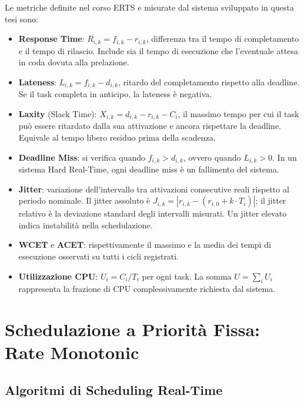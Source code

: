 Le metriche definite nel corso ERTS \cite{brugali_erts_2025} e misurate dal sistema sviluppato in questa tesi sono:

\begin{itemize}
	\item \textbf{Response Time}: $R_{i,k} = f_{i,k} - r_{i,k}$, differenza tra il tempo di completamento e il tempo di rilascio. Include sia il tempo di esecuzione che l'eventuale attesa in coda dovuta alla prelazione.
	
	\item \textbf{Lateness}: $L_{i,k} = f_{i,k} - d_{i,k}$, ritardo del completamento rispetto alla deadline. Se il task completa in anticipo, la lateness è negativa.
	
	\item \textbf{Laxity} (Slack Time): $X_{i,k} = d_{i,k} - r_{i,k} - C_i$, il massimo tempo per cui il task può essere ritardato dalla sua attivazione e ancora rispettare la deadline. Equivale al tempo libero residuo prima della scadenza.
	
	\item \textbf{Deadline Miss}: si verifica quando $f_{i,k} > d_{i,k}$, ovvero quando $L_{i,k} > 0$. In un sistema Hard Real-Time, ogni deadline miss è un fallimento del sistema.
	
	\item \textbf{Jitter}: variazione dell'intervallo tra attivazioni consecutive reali rispetto al periodo nominale. Il jitter assoluto è $J_{i,k} = |r_{i,k} - (r_{i,0} + k \cdot T_i)|$; il jitter relativo è la deviazione standard degli intervalli misurati. Un jitter elevato indica instabilità nella schedulazione.
	
	\item \textbf{WCET} e \textbf{ACET}: rispettivamente il massimo e la media dei tempi di esecuzione osservati su tutti i cicli registrati.
	
	\item \textbf{Utilizzazione CPU}: $U_i = C_i / T_i$ per ogni task. La somma $U = \sum_i U_i$ rappresenta la frazione di CPU complessivamente richiesta dal sistema.
\end{itemize}

\section{Schedulazione a Priorità Fissa: Rate Monotonic}
\label{sec:rms}

\subsection{Algoritmi di Scheduling Real-Time}

